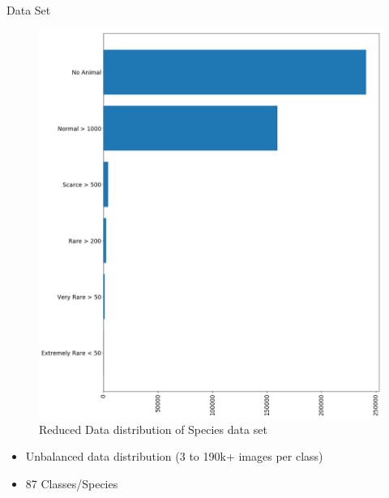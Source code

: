 \documentclass[10pt]{beamer}
\begin{document}
\begin{frame}{Data Set}
	\begin{minipage}[c]{0.48\linewidth}
		\centering
		\begin{figure}
			\includegraphics[width=\linewidth,height=.8\textheight,keepaspectratio]{images/Data_dist_sorted_reduced_v2.png}
			\caption{Reduced Data distribution of Species data set}
		\end{figure}
	\end{minipage}
	\hfill
	\begin{minipage}[c]{0.48\linewidth}
	\begin{itemize}
		\item Unbalanced data distribution (3 to 190k+ images per class)
		\item 87 Classes/Species
	\end{itemize}

	\end{minipage}
\end{frame}

\end{document}
